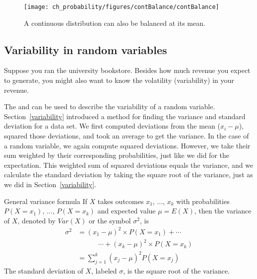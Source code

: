 \begin{figure}
\centering
\texttt{[image: ch\_probability/figures/contBalance/contBalance]}
\caption{A continuous distribution can also be balanced at its mean.}
\label{contBalance}
\end{figure}



\subsection{Variability in random variables}

Suppose you ran the university bookstore. Besides how much revenue you expect to generate, you might also want to know the volatility (variability) in your revenue. 

The  and  can be used to describe the variability of a random variable. Section~\ref{variability}
introduced a method for finding the variance and standard deviation for a data set. We first computed deviations from the mean ($x_i - \mu$), squared those deviations, and took an average to get the variance. In the case of a random variable, we again compute squared deviations. However, we take their sum weighted by their corresponding probabilities, just like we did for the expectation. This weighted sum of squared deviations equals the variance, and we calculate the standard deviation by taking the square root of the variance, just as we did in Section~\ref{variability}.

\begin{onebox}{General variance formula}
If $X$ takes outcomes $x_1$, ..., $x_k$ with probabilities $P(X=x_1)$, ..., $P(X=x_k)$ and expected value $\mu=E(X)$, then the variance of $X$, denoted by $Var(X)$ or the symbol $\sigma^2$, is
\begin{align*}
\sigma^2 &= (x_1-\mu)^2\times P(X=x_1) + \cdots \\
	& \qquad\quad\cdots+ (x_k-\mu)^2\times P(X=x_k) \\
	&= \sum_{j=1}^{k} (x_j - \mu)^2 P(X=x_j)
\end{align*}
The standard deviation of $X$, labeled $\sigma$, is the square root of the variance.
\end{onebox}

